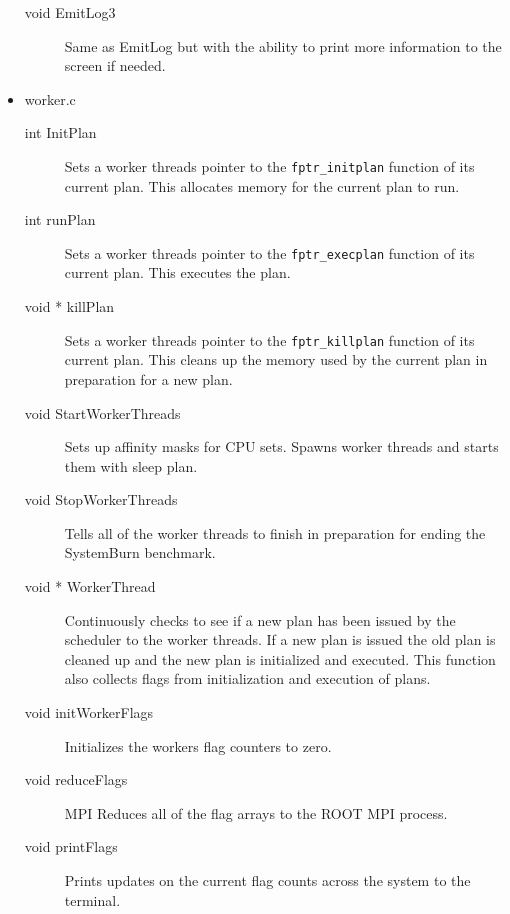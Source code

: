 \begin{itemize}
\begin{description}
		\item [void EmitLog3] Same as EmitLog but with the ability to print more information to the screen if needed. 
	\end{description}
	\item worker.c
	\begin{description}
		\item [int InitPlan] Sets a worker threads pointer to the \verb!fptr_initplan! function of its current plan. This allocates memory for the current plan to run.  
		\item [int runPlan] Sets a worker threads pointer to the \verb!fptr_execplan! function of its current plan. This executes the plan.
		\item [void * killPlan] Sets a worker threads pointer to the \verb!fptr_killplan! function of its current plan. This cleans up the memory used by the current plan in preparation for a new plan. 
		\item [void StartWorkerThreads] Sets up affinity masks for CPU sets. Spawns worker threads and starts them with sleep plan. 
		\item [void StopWorkerThreads] Tells all of the worker threads to finish in preparation for ending the SystemBurn benchmark.
		\item [void * WorkerThread] Continuously checks to see if a new plan has been issued by the scheduler to the worker threads. If a new plan is issued the old plan is cleaned up and the new plan is initialized and executed. This function also collects flags from initialization and execution of plans.
		\item [void initWorkerFlags] Initializes the workers flag counters to zero. 
		\item [void reduceFlags] MPI Reduces all of the flag arrays to the ROOT MPI process. 
		\item [void printFlags] Prints updates on the current flag counts across the system to the terminal. 
	\end{description}
\end{itemize}
